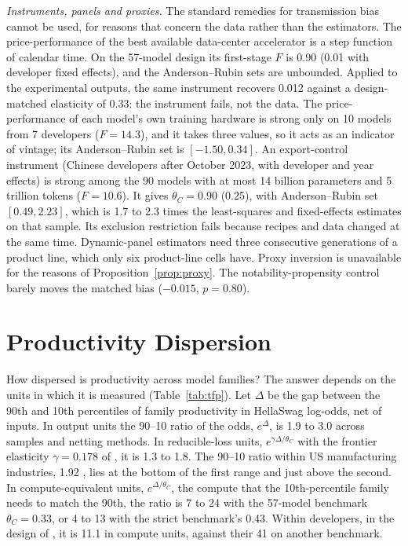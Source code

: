 \documentclass[AER,finalmode]{AEA}
\theoremstyle{definition}
\theoremstyle{remark}
\begin{document}
\textit{Instruments, panels and proxies.} The standard remedies for transmission bias cannot be used, for reasons that
concern the data rather than the estimators. The price-performance of the best available data-center accelerator is a
step function of calendar time. On the 57-model design its first-stage $F$ is 0.90 (0.01 with developer fixed effects),
and the Anderson--Rubin sets are unbounded. Applied to the experimental outputs, the same instrument recovers 0.012
against a design-matched elasticity of 0.33: the instrument fails, not the data. The price-performance of each model's
own training hardware is strong only on 10 models from 7 developers ($F=14.3$), and it takes three values, so it acts
as an indicator of vintage; its Anderson--Rubin set is $[-1.50,0.34]$. An export-control instrument (Chinese developers
after October 2023, with developer and year effects) is strong among the 90 models with at most 14 billion parameters
and 5 trillion tokens ($F=10.6$). It gives $\theta_C=0.90$ (0.25), with Anderson--Rubin set $[0.49,2.23]$, which is 1.7
to 2.3 times the least-squares and fixed-effects estimates on that sample. Its exclusion restriction fails because
recipes and data changed at the same time. Dynamic-panel estimators \citep{arellano1991some,blundell1998initial} need
three consecutive generations of a product line, which only six product-line cells have. Proxy inversion is unavailable
for the reasons of Proposition~\ref{prop:proxy}. The notability-propensity control barely moves the matched bias
($-0.015$, $p=0.80$).

\section{Productivity Dispersion}\label{sec:tfp}

How dispersed is productivity across model families? The answer depends on the units in which it is measured
(Table~\ref{tab:tfp}). Let $\Delta$ be the gap between the 90th and 10th percentiles of family productivity in
HellaSwag log-odds, net of inputs. In output units the 90--10 ratio of the odds, $e^{\Delta}$, is 1.9 to 3.0 across
samples and netting methods. In reducible-loss units, $e^{\gamma\Delta/\theta_C}$ with the frontier elasticity
$\gamma=0.178$ of \citet{besiroglu2024chinchilla}, it is 1.3 to 1.8. The 90--10 ratio within US manufacturing
industries, 1.92 \citep{syverson2004product}, lies at the bottom of the first range and just above the second. In compute-equivalent units, $e^{\Delta/\theta_C}$,
the compute that the 10th-percentile family needs to match the 90th, the ratio is 7 to 24 with the 57-model benchmark
$\theta_C=0.33$, or 4 to 13 with the strict benchmark's 0.43. Within developers, in the design of
\citet{mertens2026secret}, it is 11.1 in compute units, against their 41 on another benchmark.
\end{document}
